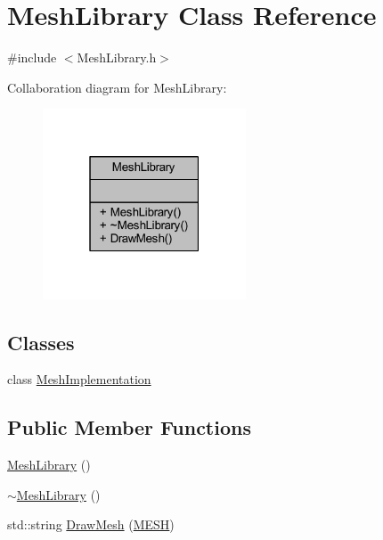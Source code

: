 \hypertarget{class_mesh_library}{}\section{Mesh\+Library Class Reference}
\label{class_mesh_library}


{\ttfamily \#include $<$Mesh\+Library.\+h$>$}



Collaboration diagram for Mesh\+Library\+:\nopagebreak
\begin{figure}[H]
\begin{center}
\leavevmode
\includegraphics[width=171pt]{class_mesh_library__coll__graph}
\end{center}
\end{figure}
\subsection*{Classes}
\begin{DoxyCompactItemize}
\item 
class \mbox{\hyperlink{class_mesh_library_1_1_mesh_implementation}{Mesh\+Implementation}}
\end{DoxyCompactItemize}
\subsection*{Public Member Functions}
\begin{DoxyCompactItemize}
\item 
\mbox{\hyperlink{class_mesh_library_a263ef8b969d1b09956513de048488082}{Mesh\+Library}} ()
\item 
\mbox{\hyperlink{class_mesh_library_ac6429ef7e113e35a9b1276ad362f81c7}{$\sim$\+Mesh\+Library}} ()
\item 
std\+::string \mbox{\hyperlink{class_mesh_library_a1b79057329cc89dfa7616fe7aa48fe42}{Draw\+Mesh}} (\mbox{\hyperlink{_p_i_m_p_l_2_p_i_m_p_l_2_commons_8h_a7d8bc2c54c2771e646f020b8420adafc}{M\+E\+SH}})
\end{DoxyCompactItemize}


